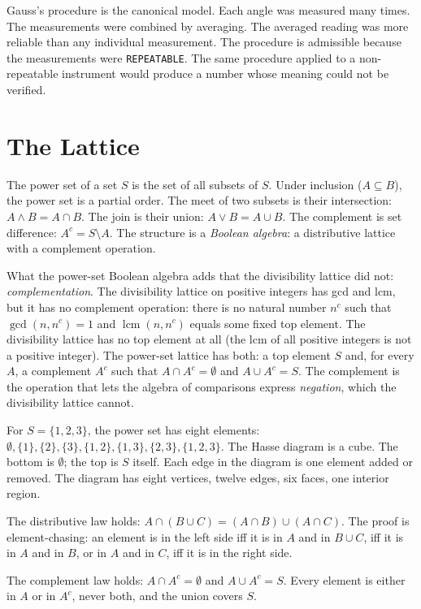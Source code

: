 Gauss's procedure is the canonical model. Each angle was measured
many times. The measurements were combined by averaging. The
averaged reading was more reliable than any individual measurement.
The procedure is admissible because the measurements were
\texttt{REPEATABLE}. The same procedure applied to a non-repeatable
instrument would produce a number whose meaning could not be
verified.

\section{The Lattice}
\label{se:the-lattice}

The power set of a set $S$ is the set of all subsets of $S$. Under
inclusion ($A \subseteq B$), the power set is a partial order. The
meet of two subsets is their intersection: $A \wedge B = A \cap B$.
The join is their union: $A \vee B = A \cup B$. The complement is
set difference: $A^c = S \setminus A$. The structure is a
\emph{Boolean algebra}: a distributive lattice with a complement
operation.

What the power-set Boolean algebra adds that the divisibility
lattice did not: \emph{complementation}. The divisibility lattice
on positive integers has gcd and lcm, but it has no complement
operation: there is no natural number $n^c$ such that
$\gcd(n, n^c) = 1$ and $\operatorname{lcm}(n, n^c)$ equals some
fixed top element. The divisibility lattice has no top element at
all (the lcm of all positive integers is not a positive integer).
The power-set lattice has both: a top element $S$ and, for every
$A$, a complement $A^c$ such that $A \cap A^c = \emptyset$ and
$A \cup A^c = S$. The complement is the operation that lets the
algebra of comparisons express \emph{negation}, which the
divisibility lattice cannot.

For $S = \{1, 2, 3\}$, the power set has eight elements: $\emptyset,
\{1\}, \{2\}, \{3\}, \{1,2\}, \{1,3\}, \{2,3\}, \{1,2,3\}$. The
Hasse diagram is a cube. The bottom is $\emptyset$; the top is $S$
itself. Each edge in the diagram is one element added or removed.
The diagram has eight vertices, twelve edges, six faces, one
interior region.

The distributive law holds: $A \cap (B \cup C) = (A \cap B) \cup (A
\cap C)$. The proof is element-chasing: an element is in the left
side iff it is in $A$ and in $B \cup C$, iff it is in $A$ and in
$B$, or in $A$ and in $C$, iff it is in the right side.

The complement law holds: $A \cap A^c = \emptyset$ and $A \cup A^c
= S$. Every element is either in $A$ or in $A^c$, never both, and
the union covers $S$.

